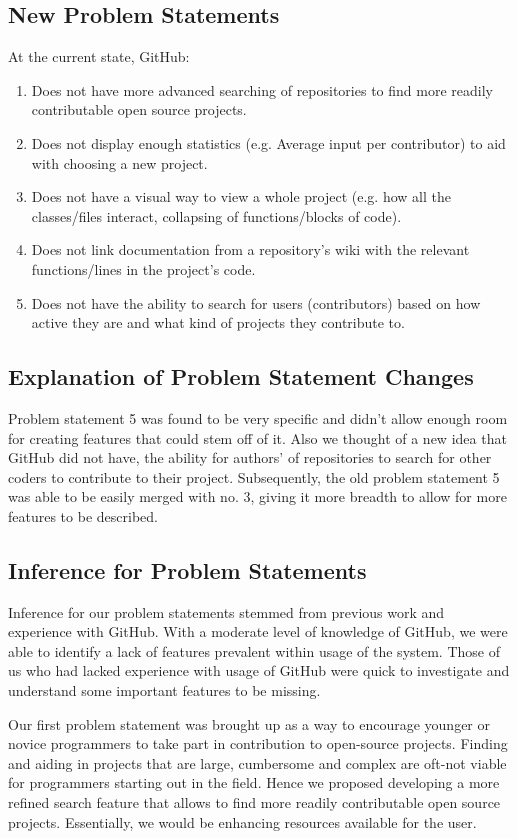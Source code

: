 \documentclass[12pt]{article}
\begin{document}
\subsection{New Problem Statements}
At the current state, \textsf{GitHub}:
\begin{enumerate}
\item  Does not have more advanced searching of repositories to find more readily contributable open source projects.
\item Does not display enough statistics (e.g. Average input per contributor) to aid with choosing a new project.
\item Does not  have a visual way to view a whole project (e.g. how all the classes/files interact, collapsing of functions/blocks of code).
\item Does not link documentation from a repository's wiki with the relevant functions/lines in the project's code.
\item Does not have the ability to search for users (contributors) based on how active they are and what kind of projects they contribute to.
\end{enumerate}

\subsection{Explanation of Problem Statement Changes}
Problem statement 5 was found to be very specific and didn't allow enough room for creating features that could stem off of it. Also we thought of a new idea that GitHub did not have, the ability for authors' of repositories to search for other coders to contribute to their project. Subsequently, the old problem statement 5 was able to be easily merged with no. 3, giving it more breadth to allow for more features to be described.

\subsection{Inference for Problem Statements}
Inference for our problem statements stemmed from previous work and experience with \textsf{GitHub}. With a moderate level of knowledge of \textsf{GitHub}, we were able to identify a lack of features prevalent within usage of the system. Those of us who had lacked experience with usage of \textsf{GitHub} were quick to investigate and understand some important features to be missing.

Our first problem statement was brought up as a way to encourage younger or novice programmers to take part in contribution to open-source projects. Finding and aiding in projects that are large, cumbersome and complex are oft-not viable for programmers starting out in the field. Hence we proposed developing a more refined search feature that allows to find more readily contributable open source projects. Essentially, we would be enhancing resources available for the user.
\end{document}
